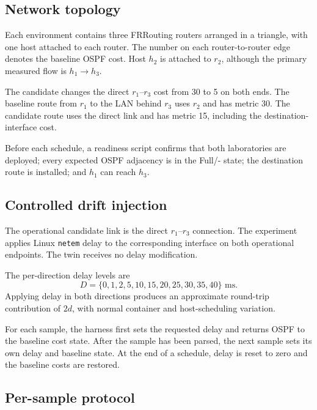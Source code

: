 \subsection{Network topology}

Each environment contains three FRRouting routers arranged in a triangle, with one host attached to each router. The number on each router-to-router edge denotes the baseline OSPF cost. Host $h_2$ is attached to $r_2$, although the primary measured flow is $h_1\rightarrow h_3$.

The candidate changes the direct $r_1$--$r_3$ cost from 30 to 5 on both ends. The baseline route from $r_1$ to the LAN behind $r_3$ uses $r_2$ and has metric 30. The candidate route uses the direct link and has metric 15, including the destination-interface cost.

Before each schedule, a readiness script confirms that both laboratories are deployed; every expected OSPF adjacency is in the Full/- state; the destination route is installed; and $h_1$ can reach $h_3$.

\subsection{Controlled drift injection}

The operational candidate link is the direct $r_1$--$r_3$ connection. The experiment applies Linux \texttt{netem} delay to the corresponding interface on both operational endpoints. The twin receives no delay modification.

The per-direction delay levels are
\[
D=\{0,1,2,5,10,15,20,25,30,35,40\}\text{ ms}.
\]
Applying delay in both directions produces an approximate round-trip contribution of $2d$, with normal container and host-scheduling variation.

For each sample, the harness first sets the requested delay and returns OSPF to the baseline cost state. After the sample has been parsed, the next sample sets its own delay and baseline state. At the end of a schedule, delay is reset to zero and the baseline costs are restored.

\subsection{Per-sample protocol}

